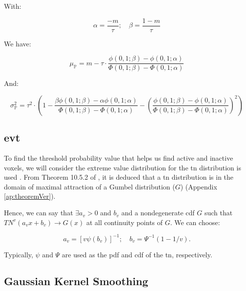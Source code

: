 With:

\begin{equation}
\alpha = \frac{-m}{\tau}; \quad \beta = \frac{1-m}{\tau}
\label{eq:alpha_beta}
\end{equation}

We have:

\begin{equation} \label{eq:mu_P}
\mu_{\bm{\mathbb{P}}} = m - \tau \cdot \frac{\phi(0,1;\beta)-\phi(0,1;\alpha)}{\Phi(0,1;\beta)-\Phi(0,1;\alpha)}
\end{equation}

And:

\begin{equation} \label{eq:sigma_P}
\sigma^2_{\bm{\mathbb{P}}} = \tau^2 \cdot \left( 1 - \frac{\beta \phi(0,1;\beta)- \alpha \phi(0,1;\alpha)}{\Phi(0,1;\beta)-\Phi(0,1;\alpha)} - \left( \frac{\phi(0,1;\beta)-\phi(0,1;\alpha)}{\Phi(0,1;\beta)-\Phi(0,1;\alpha)} \right)^2 \right)
\end{equation}

\subsection{\texorpdfstring{\acrlong{evt}}{Extreme Value Theory}}

To find the threshold probability value that helps us find active and inactive voxels, 
we will consider the extreme value distribution for the \gls{tn} distribution is 
used \cite{burkardt2014truncated, nadarajah2004beta}. From Theorem 
10.5.2 of \cite{david2004order}, it is deduced that a \gls{tn} distribution is 
in the domain of maximal attraction of a Gumbel distribution ($G$) (Appendix \ref{ap:theoremVer}).

Hence, we can say that $\exists a_v>0$ and $b_v$ and a nondegenerate \gls{cdf} $G$ 
such that $TN^v(a_vx+b_v) \rightarrow G(x)$ at all continuity points of $G$. We can choose:

\begin{equation}
a_v = \left[ v\psi(b_v) \right]^{-1}; \quad b_v = \Psi^{-1}(1-1/v).
\label{eq:av_bv}
\end{equation}

Typically, $\psi$ and $\Psi$ are used as the \gls{pdf} and \gls{cdf} of the \gls{tn}, 
respectively.

\subsection{Gaussian Kernel Smoothing}

